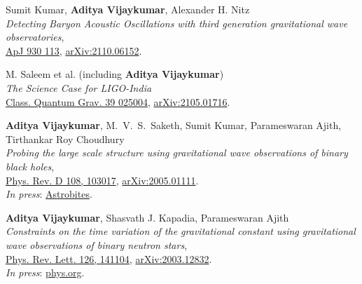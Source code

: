 \begin{etaremune}
	\item 
	Sumit Kumar, \textbf{Aditya Vijaykumar}, Alexander H. Nitz\\
	\textit{Detecting Baryon Acoustic Oscillations with third generation gravitational wave observatories},\\
	\href{https://iopscience.iop.org/article/10.3847/1538-4357/ac5e34}{ApJ 930 113}, \href{https://arxiv.org/abs/2110.06152}{arXiv:2110.06152}.

	\item M. Saleem et al. (including \textbf{Aditya Vijaykumar})\\
	\textit{The Science Case for LIGO-India}\\
	\href{https://iopscience.iop.org/article/10.1088/1361-6382/ac3b99}{Class. Quantum Grav. 39 025004}, \href{https://arxiv.org/abs/2105.01716}{arXiv:2105.01716}.
	
	\item 
	\textbf{Aditya Vijaykumar}, M.~V.~S.~Saketh, Sumit Kumar, Parameswaran Ajith, Tirthankar Roy Choudhury\\
	\textit{Probing the large scale structure using gravitational wave observations of binary black holes},\\
	\href{https://journals.aps.org/prd/abstract/10.1103/PhysRevD.108.103017}{Phys. Rev. D 108, 103017}, \href{https://arxiv.org/abs/2005.01111}{arXiv:2005.01111}.\\
	\textit{In press}: \href{https://astrobites.org/2020/05/07/binary-black-holes-tangled-up-in-the-cosmic-web/}{Astrobites}.
	
	\item 
	\textbf{Aditya Vijaykumar}, Shasvath J. Kapadia, Parameswaran Ajith\\
	\textit{Constraints on the time variation of the gravitational constant using gravitational wave observations of binary neutron stars},\\
	\href{https://journals.aps.org/prl/abstract/10.1103/PhysRevLett.126.141104}{{Phys. Rev. Lett}. 126, 141104}, \href{https://arxiv.org/abs/2003.12832}{arXiv:2003.12832}.\\
	\textit{In press}: \href{https://phys.org/news/2021-05-constraints-variation-gravitational-constant.html}{phys.org}.

\end{etaremune}

